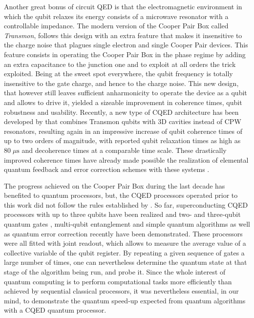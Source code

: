 Another great bonus of circuit QED is that the electromagnetic environment  in which the qubit  relaxes its energy consists of  a microwave resonator with a controllable impedance.  The modern version of the Cooper Pair Box called {\it Transmon}, follows this design with an extra feature that makes it insensitive to the charge noise that plagues single electron and single Cooper Pair  devices. This feature consists in operating the Cooper Pair Box in the   phase regime by adding an extra capacitance to the   junction one and to  exploit at all orders   the trick exploited.  Being at the sweet spot everywhere,  the qubit frequency is totally insensitive to the gate charge, and hence to the charge noise. This new design, that however still leaves sufficient anharmonicity to operate the device as a qubit and allows to drive it,  yielded a sizeable   improvement in coherence times, qubit robustness and usability. 
Recently, a new type of CQED architecture has been developed by \cite{paik_observation_2011} that combines Transmon qubits with 3D cavities instead of CPW resonators, resulting again in an impressive increase of qubit coherence times of up to two orders of magnitude, with reported qubit relaxation times as high as $80 \; \mu \mathrm{s}$ and decoherence times at a comparable time scale. These drastically improved coherence times have already made possible the realization of elemental quantum feedback and error correction schemes with these systems . 

\smallskip

The progress achieved on the Cooper Pair Box during the last decade has benefited to quantum processors, but, the CQED processors operated prior to  this work did not follow the rules established by \cite{divincenzo_physical_2000}.  So far, superconducting CQED processors with up to three qubits have been realized and two- and three-qubit quantum gates \citep{fedorov_implementation_2011}, multi-qubit entanglement \citep{dicarlo_preparation_2010} and simple quantum algorithms \citep{dicarlo_demonstration_2009} as well as quantum error correction recently  \citep{reed_realization_2011} have been demonstrated. These processors were all fitted with joint readout, which allows to measure the average value of a collective variable of the qubit register. By repeating a given sequence of gates a large number of times, one can nevertheless determine the quantum state at that stage of the algorithm being run, and probe it.
Since the whole interest of quantum computing is to perform computational tasks more efficiently than achieved by sequential classical processors, it was nevertheless essential, in our mind, to demonstrate the quantum speed-up expected from quantum algorithms with a CQED quantum processor.

